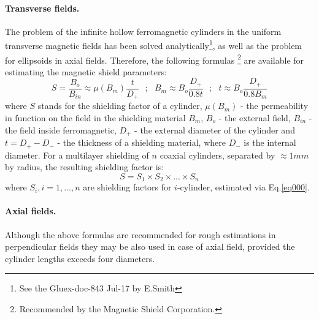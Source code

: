 \documentclass[12pt]{article}
\begin{document}
\paragraph{Transverse fields.}
The problem of the  infinite  hollow ferromagnetic cylinders in the uniform
transverse magnetic fields has been  solved analytically\footnote{See the  Gluex-doc-843 Jul-17 by E.Smith}, as well as the
 problem  for ellipsoids in axial fields.  Therefore,  the following formulas
\footnote{Recommended by  the Magnetic Shield
 Corporation.}
 are available for estimating  the magnetic shield parameters:
\begin{equation}
S=\frac{B_o}{B_{in}}\approx \mu({B_m})\frac{t}{D_+}~~~;~~~B_m\approx B_o\frac{D_+}{0.8t}~~~;~~~t\approx B_o\frac{D_+}{0.8B_m}
\label{eq000}
\end{equation}
where $S$ stands for the shielding factor of a cylinder,
$\mu(B_m)$ - the permeability in function  on the field in the shielding material $B_m$,
$B_o$ - the external  field, 
$B_{in}$ - the field inside ferromagnetic,
$D_+$ - the external diameter of the cylinder and
$t=D_+-D_-$ - the thickness of a shielding material, where $D_-$ 
is the internal diameter. 
For a multilayer shielding of $n$ coaxial cylinders, separated by $\approx 1mm$ by radius,
the resulting shielding factor is:
%
\begin{equation}
S=S_1 \times S_2 \times...\times S_n
\label{eq777}
\end{equation}
%
where $S_i,i=1,...,n$ are shielding factors for
$i$-cylinder,  estimated via Eq.\ref{eq000}.
\paragraph{Axial fields.}
Although the above formulas are recommended  for rough estimations
in perpendicular fields they may be also used in case of  
axial field, provided the
cylinder lengths exceeds  four  diameters.
\end{document}
